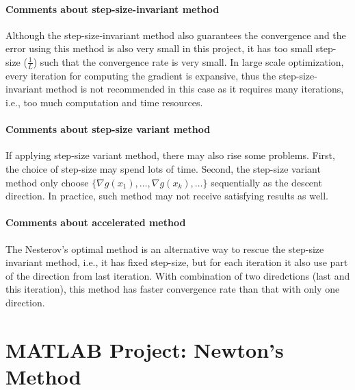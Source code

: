 \paragraph{Comments about step-size-invariant method}
Although the step-size-invariant method also guarantees the convergence and the error using this method is also very small in this project, it has too small step-size ($\frac{1}{L}$) such that the convergence rate is very small. In large scale optimization, every iteration for computing the gradient is expansive, thus the step-size-invariant method is not recommended in this case as it requires many iterations, i.e., too much computation and time resources.
\paragraph{Comments about step-size variant method}
If applying step-size variant method, there may also rise some problems. First, the choice of step-size may spend lots of time. Second, the step-size variant method only choose $\{\nabla g(x_1),\dots,\nabla g(x_k),\dots\}$ sequentially as the descent direction. In practice, such method may not receive satisfying results as well.
\paragraph{Comments about accelerated method}
The Nesterov’s optimal method is an alternative way to rescue the step-size invariant method, i.e., it has fixed step-size, but for each iteration it also use part of the direction from last iteration. With combination of two diredctions (last and this iteration), this method has faster convergence rate than that with only one direction.






\clearpage
\section{MATLAB Project: Newton’s Method}
